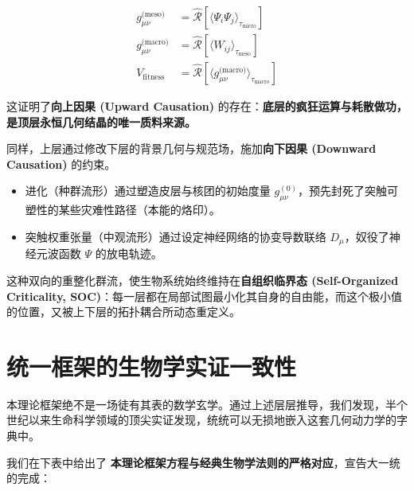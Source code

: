 \begin{align}
    g^{\text{(meso)}}_{\mu\nu} &= \hat{\mathcal{R}} \left[ \langle \Psi_i \Psi_j \rangle_{\tau_{\text{micro}}} \right] \\
    g^{\text{(macro)}}_{\mu\nu} &= \hat{\mathcal{R}} \left[ \langle W_{ij} \rangle_{\tau_{\text{meso}}} \right] \\
    V_{\text{fitness}} &= \hat{\mathcal{R}} \left[ \langle g^{\text{(macro)}}_{\mu\nu} \rangle_{\tau_{\text{macro}}} \right]
\end{align}

这证明了\textbf{向上因果 (Upward Causation)} 的存在：\textbf{底层的疯狂运算与耗散做功，是顶层永恒几何结晶的唯一质料来源。}


同样，上层通过修改下层的背景几何与规范场，施加\textbf{向下因果 (Downward Causation)} 的约束。
\begin{itemize}
    \item 进化（种群流形）通过塑造皮层与核团的初始度量 $g^{(0)}_{\mu\nu}$，预先封死了突触可塑性的某些灾难性路径（本能的烙印）。
    \item 突触权重张量（中观流形）通过设定神经网络的协变导数联络 $D_\mu$，奴役了神经元波函数 $\Psi$ 的放电轨迹。
\end{itemize}

这种双向的重整化群流，使生物系统始终维持在\textbf{自组织临界态 (Self-Organized Criticality, SOC)}：每一层都在局部试图最小化其自身的自由能，而这个极小值的位置，又被上下层的拓扑耦合所动态重定义。


\section{统一框架的生物学实证一致性}
\label{sec:empirical_consistency_biology}

本理论框架绝不是一场徒有其表的数学玄学。通过上述层层推导，我们发现，半个世纪以来生命科学领域的顶尖实证发现，统统可以无损地嵌入这套几何动力学的字典中。

我们在下表中给出了 \textbf{本理论框架方程与经典生物学法则的严格对应}，宣告大一统的完成：

